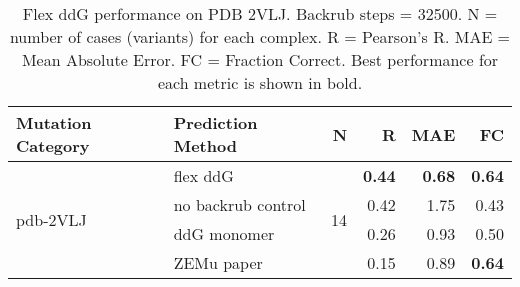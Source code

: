 \begin{table}
  \begin{tabular}{llrrrr}
\toprule
Mutation Category &   Prediction Method &   N &    R &  MAE &   FC \\
\midrule
 \multirow{ 4}{*}{pdb-2VLJ} & flex ddG & \multirow{ 4}{*}{14} & \textbf{0.44} & \textbf{0.68} & \textbf{0.64}  \\
 & no backrub control & & 0.42 & 1.75 & 0.43  \\
 & ddG monomer & & 0.26 & 0.93 & 0.50  \\
 & ZEMu paper & & 0.15 & 0.89 & \textbf{0.64}  \\
\bottomrule
\end{tabular}
  \caption[Flex ddG performance on PDB 2VLJ]{
    Flex ddG performance on PDB 2VLJ. Backrub steps = 32500. N = number of cases (variants) for each complex. R = Pearson's R. MAE = Mean Absolute Error. FC = Fraction Correct. Best performance for each metric is shown in bold.
  } \label{tab:table-pdb-2VLJ}
\end{table}
